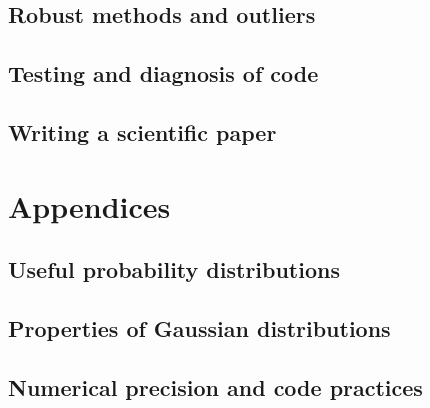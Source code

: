 \documentclass[10pt]{book}
\begin{document}
\chapter{Robust methods and outliers}

\chapter{Testing and diagnosis of code}

\chapter{Writing a scientific paper}

\appendix
\part*{Appendices}\markboth{}{}

\chapter{Useful probability distributions}

\chapter{Properties of Gaussian distributions}

\chapter{Numerical precision and code practices}
\end{document}
